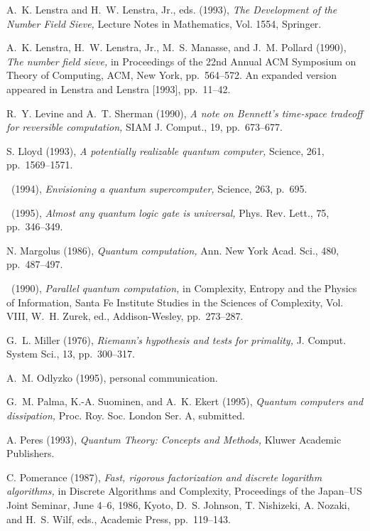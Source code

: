{\begin{thebibliography}{}
  {\sc A.~K. Lenstra and 
H.~W. Lenstra, Jr.,} eds. (1993), {\em The Development of the Number 
Field Sieve,} Lecture Notes in Mathematics, Vol. 1554, Springer.

 {\sc A.~K. Lenstra, 
H.~W. Lenstra, Jr., M.~S. Manasse, and J.~M. Pollard} (1990), {\em The
number field sieve,} in {Proceedings of the 22nd Annual ACM Symposium
on Theory of Computing,} ACM, New York, pp.~564--572. \newblock An expanded 
version appeared in Lenstra and Lenstra [1993], pp.~11--42.

 {\sc R.~Y. Levine and A.~T. Sherman}
(1990), {\em A note on Bennett's time-space tradeoff for reversible
computation,} {SIAM J. Comput.,} {19,} pp.~673--677.

 {\sc S. Lloyd} (1993), {\em A potentially 
realizable quantum computer,} {Science,} {261,} pp.~1569--1571. 

 \sameauthor\  (1994), {\em Envisioning a quantum 
supercomputer,} {Science,} {263,} p.~695. 

 \sameauthor\  (1995), {\em Almost any quantum 
logic gate is universal,} {Phys. Rev. Lett.,} {75,} pp.~346--349.

 {\sc N. Margolus} (1986), {\em Quantum 
computation,} {Ann. New York Acad. Sci.,} {480,} 
pp.~487--497.

 \sameauthor\  (1990), {\em Parallel quantum
computation,} in {Complexity, Entropy and the Physics of 
Information, Santa Fe Institute Studies in the Sciences of Complexity,
Vol. VIII,} W.~H. Zurek, ed., Addison-Wesley, pp.~273--287.

 {\sc G.~L. Miller} (1976), {\em Riemann's 
hypothesis and tests for primality,} {J. Comput. System Sci.,}  {13,} 
pp.~300--317.

 {\sc A.~M. Odlyzko} (1995), 
personal communication.

 {\sc G.~M. Palma, K.-A. Suominen,
and A.~K. Ekert} (1995), {\em Quantum computers and dissipation,} 
Proc. Roy. Soc. London Ser. A, submitted.

 {\sc A. Peres} (1993), 
{\em Quantum Theory{\rm :} Concepts and Methods,} Kluwer Academic Publishers.

 {\sc C. Pomerance} (1987), {\em Fast, 
rigorous factorization and discrete logarithm algorithms,} in {Discrete 
Algorithms and Complexity,} Proceedings of the Japan--US Joint Seminar,
June 4--6, 1986, Kyoto, D.~S. Johnson, T. Nishizeki, A. Nozaki, and H.~S.
Wilf, eds., Academic Press, pp.~119--143.


\end{thebibliography}}

